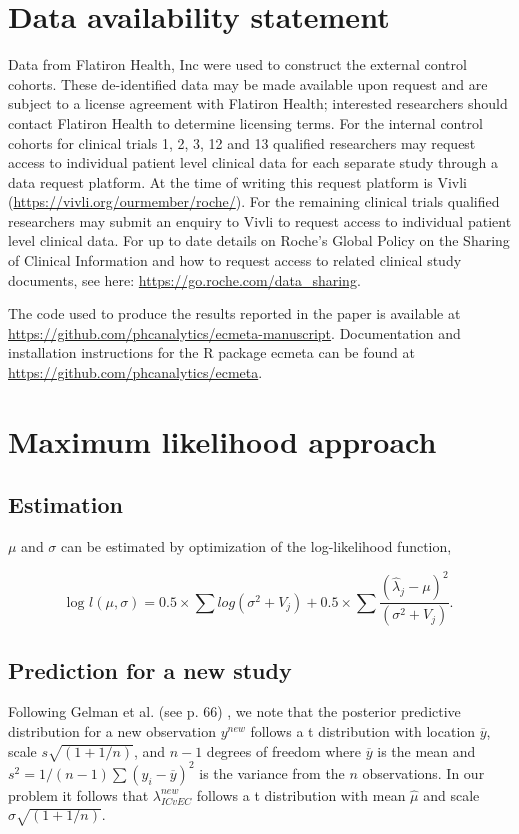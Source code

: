 \documentclass[11pt,final,fleqn]{article}\usepackage[]{graphicx}\usepackage[]{color}
\newcommand{\pkg}[1]{{\fontseries{m}\fontseries{b}\selectfont #1}}
\begin{document}



\section*{Data availability statement}
Data from Flatiron Health, Inc were used to construct the external control cohorts. These de-identified data may be made available upon request and are subject to a license agreement with Flatiron Health; interested researchers should contact Flatiron Health to determine licensing terms. For the internal control cohorts for clinical trials 1, 2, 3, 12 and 13 qualified researchers may request access to individual patient level clinical data for each separate study through a data request platform. At the time of writing this request platform is Vivli (\url{https://vivli.org/ourmember/roche/}). For the remaining clinical trials qualified researchers may submit an enquiry to Vivli to request access to individual patient level clinical data. For up to date details on Roche's Global Policy on the Sharing of Clinical Information and how to request access to related clinical study documents, see here:  \url{https://go.roche.com/data_sharing}.

The code used to produce the results reported in the paper is available at \url{https://github.com/phcanalytics/ecmeta-manuscript}. Documentation and installation instructions for the \textsf{R} package \pkg{ecmeta} can be found at \url{https://github.com/phcanalytics/ecmeta}. 


\appendix
\renewcommand\thefigure{\thesection.\arabic{figure}}    
\setcounter{figure}{0} 

\section{Maximum likelihood approach} \label{appendix:ml}
\subsection{Estimation}
$\mu$ and $\sigma$ can be estimated by optimization of the log-likelihood function,

\begin{equation}
\text{log } l(\mu,\sigma) = 0.5 \times \sum{log(\sigma^2+V_j)} +
0.5 \times \sum{ \frac{(\hat\lambda_j-\mu)^2}{(\sigma^2+V_j)} }.
\end{equation}

\subsection{Prediction for a new study}
Following Gelman et al. (see p. 66) \cite{gelman2013bayesian}, we note that the posterior predictive distribution for a new observation $y^{new}$ follows a t distribution with location $\overline{y}$, scale $s\sqrt{(1 + 1/n)}$, and $n-1$ degrees of freedom where $\overline{y}$ is the mean and $s^2=1/(n-1)\sum (y_i - \overline{y})^2$ is the variance from the $n$ observations. In our problem it follows that $\lambda_{ICvEC}^{new}$ follows a t distribution with mean $\hat{\mu}$ and scale $\hat{\sigma}\sqrt{(1 + 1/n)}$.
\end{document}
